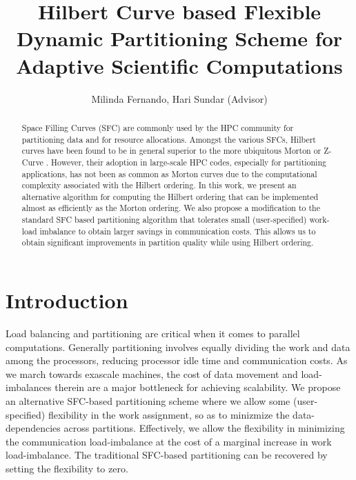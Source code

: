 \documentclass{sig-alternate}
\title{Hilbert Curve based Flexible Dynamic Partitioning Scheme for Adaptive Scientific Computations}
\author{Milinda Fernando, Hari Sundar (Advisor)}
\affil{School of Computing, University of Utah}
\date{}
\begin{document}
\maketitle

\begin{abstract}

  Space Filling Curves (SFC) are commonly used by the HPC community for
  partitioning data\cite{campbell2003,devine2005,sundar2007} and for resource
  allocations\cite{bender51,slurm}. Amongst the various SFCs, Hilbert curves
  have been found to be in general superior to the more ubiquitous Morton or
  Z-Curve \cite{campbell2003}. However, their adoption in large-scale HPC
  codes, especially for partitioning applications, has not been as common as
  Morton curves due to the computational complexity associated with the Hilbert
  ordering. In this work, we present an alternative algorithm for computing the
  Hilbert ordering that can be implemented almost as efficiently as the Morton
  ordering. 
  We also propose a modification to the standard SFC based
  partitioning algorithm that tolerates small (user-specified) work-load imbalance 
  to obtain larger savings in communication costs. This
  allows us to obtain significant improvements in
  partition quality while using Hilbert ordering.
\end{abstract}

\section{Introduction}

Load balancing and partitioning are critical when it comes to parallel
computations. Generally partitioning involves equally dividing the work and
data among the processors, reducing processor idle time and communication
costs. 
As we march towards exascale machines, the cost of data movement and
load-imbalances therein are a major bottleneck for achieving scalability. We
propose an alternative SFC-based partitioning scheme where we allow some
(user-specified) flexibility in the work assignment, so as to minizmize the
data-dependencies across partitions. Effectively, we allow the flexibility in
minimizing the communication load-imbalance at the cost of a marginal increase
in work load-imbalance. The traditional SFC-based partitioning can be recovered
by setting the flexibility to zero.  
\end{document}
